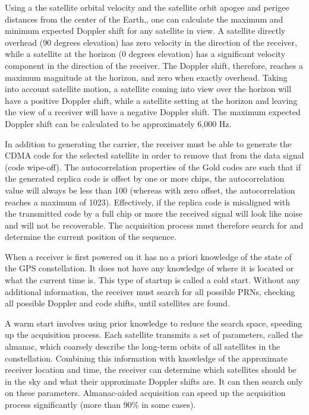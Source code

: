 \documentclass[12pt]{article}
\begin{document}
Using a the satellite orbital velocity and the satellite orbit apogee and perigee distances from the center of the Earth,, one can calculate the maximum and minimum expected Doppler shift for any satellite in view. A satellite directly overhead (90 degrees elevation) has zero velocity in the direction of the receiver, while a satellite at the horizon (0 degrees elevation) has a significant velocity component in the direction of the receiver. The Doppler shift, therefore, reaches a maximum magnitude at the horizon, and zero when exactly overhead. Taking into account satellite motion, a satellite coming into view over the horizon will have a positive Doppler shift, while a satellite setting at the horizon and leaving the view of a receiver will have a negative Doppler shift. The maximum expected Doppler shift can be calculated to be approximately 6,000 Hz.

In addition to generating the carrier, the receiver must be able to generate the CDMA code for the selected satellite in order to remove that from the data signal (code wipe-off). The autocorrelation properties of the Gold codes are such that if the generated replica code is offset by one or more chips, the autocorrelation value will always be less than 100 (whereas with zero offset, the autocorrelation reaches a maximum of 1023). Effectively, if the replica code is misaligned with the transmitted code by a full chip or more the received signal will look like noise and will not be recoverable. The acquisition process must therefore search for and determine the current position of the sequence.

When a receiver is first powered on it has no a priori knowledge of the state of the GPS constellation. It does not have any knowledge of where it is located or what the current time is. This type of startup is called a cold start. Without any additional information, the receiver must search for all possible PRNs, checking all possible Doppler and code shifts, until satellites are found.

A warm start involves using prior knowledge to reduce the search space, speeding up the acquisition process. Each satellite transmits a set of parameters, called the almanac, which coarsely describe the long-term orbits of all satellites in the constellation. Combining this information with knowledge of the approximate receiver location and time, the receiver can determine which satellites should be in the sky and what their approximate Doppler shifts are. It can then search only on these parameters. Almanac-aided acquisition can speed up the acquisition process significantly (more than 90\% in some cases).
\end{document}
